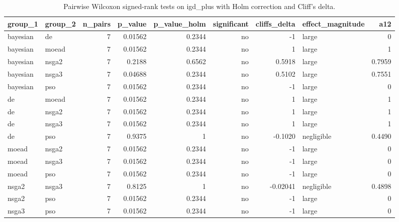 \begin{table}[!t]
\centering
\caption{Pairwise Wilcoxon signed-rank tests on igd_plus with Holm correction and Cliff's delta.}
\label{tab:statistics_optimizer_pairwise_igd_plus_main}
\footnotesize
\begin{tabular}{llrrrrrlr}
\toprule
group\_1 & group\_2 & n\_pairs & p\_value & p\_value\_holm & significant & cliffs\_delta & effect\_magnitude & a12 \\
\midrule
bayesian & de & 7 & 0.01562 & 0.2344 & no & -1 & large & 0 \\
bayesian & moead & 7 & 0.01562 & 0.2344 & no & 1 & large & 1 \\
bayesian & nsga2 & 7 & 0.2188 & 0.6562 & no & 0.5918 & large & 0.7959 \\
bayesian & nsga3 & 7 & 0.04688 & 0.2344 & no & 0.5102 & large & 0.7551 \\
bayesian & pso & 7 & 0.01562 & 0.2344 & no & -1 & large & 0 \\
de & moead & 7 & 0.01562 & 0.2344 & no & 1 & large & 1 \\
de & nsga2 & 7 & 0.01562 & 0.2344 & no & 1 & large & 1 \\
de & nsga3 & 7 & 0.01562 & 0.2344 & no & 1 & large & 1 \\
de & pso & 7 & 0.9375 & 1 & no & -0.1020 & negligible & 0.4490 \\
moead & nsga2 & 7 & 0.01562 & 0.2344 & no & -1 & large & 0 \\
moead & nsga3 & 7 & 0.01562 & 0.2344 & no & -1 & large & 0 \\
moead & pso & 7 & 0.01562 & 0.2344 & no & -1 & large & 0 \\
nsga2 & nsga3 & 7 & 0.8125 & 1 & no & -0.02041 & negligible & 0.4898 \\
nsga2 & pso & 7 & 0.01562 & 0.2344 & no & -1 & large & 0 \\
nsga3 & pso & 7 & 0.01562 & 0.2344 & no & -1 & large & 0 \\
\bottomrule
\end{tabular}
\end{table}
